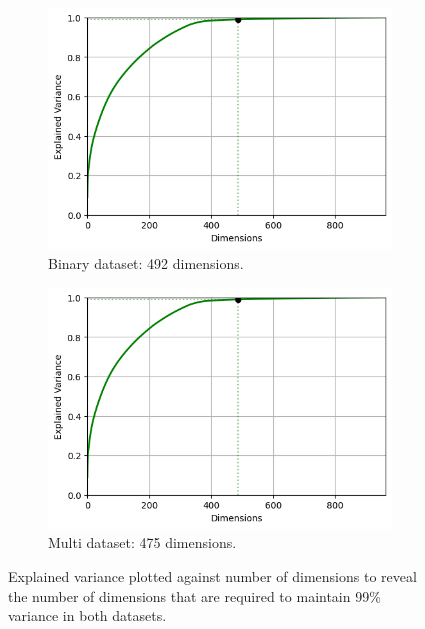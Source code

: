 \documentclass[letterpaper,12pt]{article}
\begin{document}
\begin{figure}[h]
\centering
\begin{subfigure}{0.5\textwidth}
  \centering
  \includegraphics[width=\textwidth]{report/figures/explained_variance_multi.png}
  \caption{Binary dataset: 492 dimensions.}
  \label{fig:explained_variance_binary}
\end{subfigure}%
\begin{subfigure}{.5\textwidth}
  \centering
  \includegraphics[width=\textwidth]{report/figures/explained_variance_multi.png}
    \caption{Multi dataset: 475 dimensions.}
  \label{fig:explained_variance_multi}
\end{subfigure}
\caption{\label{fig:explained_variance}Explained variance plotted against number of dimensions to reveal the number of dimensions that are  required to maintain 99\% variance in both datasets.}
\end{figure}
\end{document}
